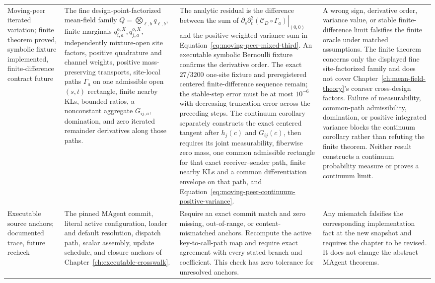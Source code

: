 \begin{longtable}{>{\raggedright\arraybackslash}p{}>{\raggedright\arraybackslash}p{}>{\raggedright\arraybackslash}p{}>{\raggedright\arraybackslash}p{}}
Moving-peer iterated variation; finite theorem proved, symbolic fixture implemented, finite-difference contract future & The fine design-point-factorized mean-field family \(Q=\bigotimes_{\ell,b}q_{\ell,b}\), finite marginals \(q_{i,a}^{o,X},q_{j,a}^{o,X}\), independently mixture-open site factors, positive quadrature and channel weights, positive mass-preserving transports, site-local paths \(\Gamma_a\) on one admissible open \((s,t)\) rectangle, finite nearby KLs, bounded ratios, a nonconstant aggregate \(G_{ij,a}\), domination, and zero iterated remainder derivatives along those paths. & The analytic residual is the difference between the sum of \(\left.\partial_s\partial_t^2(\mathcal C_D\circ\Gamma_a)\right|_{(0,0)}\) and the positive weighted variance sum in Equation~\eqref{eq:moving-peer-mixed-third}. An executable symbolic Bernoulli fixture confirms the derivative order. The exact \(27/3200\) one-site fixture and preregistered centered finite-difference sequence remain; the stable-step error must be at most \(10^{-6}\) with decreasing truncation error across the preceding steps. The continuum corollary separately constructs the exact centered tangent after \(h_j(c)\) and \(G_{ij}(c)\), then requires its joint measurability, fiberwise zero mass, one common admissible rectangle for that exact receiver--sender path, finite nearby KLs and a common differentiation envelope on that path, and Equation~\eqref{eq:moving-peer-continuum-positive-variance}. & A wrong sign, derivative order, variance value, or stable finite-difference limit falsifies the finite oracle under matched assumptions. The finite theorem concerns only the displayed fine site-factorized family and does not cover Chapter~\ref{ch:mean-field-theory}'s coarser cross-design factors. Failure of measurability, common-path admissibility, domination, or positive integrated variance blocks the continuum corollary rather than refuting the finite theorem. Neither result constructs a continuum probability measure or proves a continuum limit. \\
\addlinespace
Executable source anchors; documented trace, future recheck & The pinned MAgent commit, literal active configuration, loader and default resolution, dispatch path, scalar assembly, update schedule, and closure anchors of Chapter~\ref{ch:executable-crosswalk}. & Require an exact commit match and zero missing, out-of-range, or content-mismatched anchors. Recompute the active key-to-call-path map and require exact agreement with every stated branch and coefficient. This check has zero tolerance for unresolved anchors. & Any mismatch falsifies the corresponding implementation fact at the new snapshot and requires the chapter to be revised. It does not change the abstract MAgent theorems. \\
\end{longtable}
\normalsize

